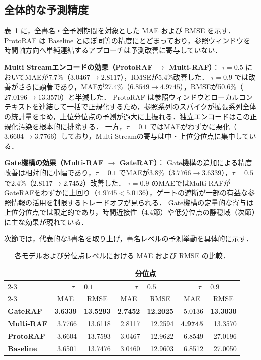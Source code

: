 \documentclass[twocolumn, lastpage]{jarticle}
\begin{document}
\subsection{全体的な予測精度}
表~\ref{tab:metric_comparison} に，全書名・全予測期間を対象とした MAE および RMSE を示す．
ProtoRAF は Baseline とほぼ同等の精度にとどまっており，参照ウィンドウを時間軸方向へ単純連結するアプローチは予測改善に寄与していない．

\textbf{Multi Streamエンコードの効果（ProtoRAF $\to$ Multi-RAF）}：
$\tau=0.5$ においてMAEが7.7\%（$3.0467 \to 2.8117$），RMSEが5.4\%改善した．
$\tau=0.9$ では改善がさらに顕著であり，MAEが27.4\%（$6.8549 \to 4.9745$），RMSEが50.6\%（$27.0196 \to 13.3570$）と半減した．
ProtoRAF は参照ウィンドウとローカルコンテキストを連結して一括で正規化するため，参照系列のスパイクが拡張系列全体の統計量を歪め，上位分位点の予測が過大に上振れる．独立エンコードはこの正規化汚染を根本的に排除する．
一方，$\tau=0.1$ ではMAEがわずかに悪化（$3.6604 \to 3.7766$）しており，Multi Streamの寄与は中・上位分位点に集中している．

\textbf{Gate機構の効果（Multi-RAF $\to$ GateRAF）}：
Gate機構の追加による精度改善は相対的に小幅であり，$\tau=0.1$ でMAEが3.8\%（$3.7766 \to 3.6339$），$\tau=0.5$ で2.4\%（$2.8117 \to 2.7452$）改善した．
$\tau=0.9$ のMAEではMulti-RAFがGateRAFをわずかに上回り（$4.9745 < 5.0136$），ゲートの遮断が一部の有益な参照情報の活用を制限するトレードオフが見られる．
Gate機構の定量的な寄与は上位分位点では限定的であり，時間近接性（4.4節）や低分位点の静穏域（次節）に主な効果が現れている．

次節では，代表的な3書名を取り上げ，書名レベルの予測挙動を具体的に示す．
    \begin{table}[t]
      \caption{各モデルおよび分位点レベルにおける MAE および RMSE の比較．}
      \label{tab:metric_comparison}
      \centering
      \begin{tabular}{lrrrrrr}
        \hline
        & \multicolumn{6}{c}{分位点} \\
        \cline{2-3} \cline{4-5} \cline{6-7}
        \multicolumn{1}{c}{モデル} & \multicolumn{2}{c}{$\tau=0.1$} & \multicolumn{2}{c}{$\tau=0.5$} & \multicolumn{2}{c}{$\tau=0.9$} \\
        \cline{2-3} \cline{4-5} \cline{6-7}
         & \multicolumn{1}{c}{MAE} & \multicolumn{1}{c}{RMSE} & \multicolumn{1}{c}{MAE} & \multicolumn{1}{c}{RMSE} & \multicolumn{1}{c}{MAE} & \multicolumn{1}{c}{RMSE} \\
        \hline\hline
        \textbf{GateRAF} & \textbf{3.6339} & \textbf{13.5293} & \textbf{2.7452} & \textbf{12.2025} & 5.0136 & \textbf{13.3030} \\
        \textbf{Multi-RAF} & 3.7766 & 13.6118 & 2.8117 & 12.2594 & \textbf{4.9745} & 13.3570 \\
        \textbf{ProtoRAF} & 3.6604 & 13.7593 & 3.0467 & 12.9622 & 6.8549 & 27.0196 \\
        \textbf{Baseline} & 3.6501 & 13.7476 & 3.0460 & 12.9603 & 6.8512 & 27.0050 \\
        \hline
      \end{tabular}
    \end{table}
\end{document}

